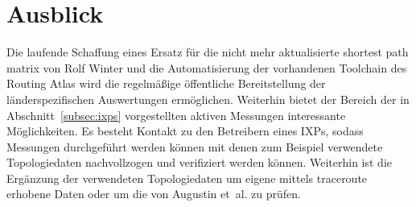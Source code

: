 \section{Ausblick}\label{sec:ausblick}
Die laufende Schaffung eines Ersatz für die nicht mehr aktualisierte shortest path matrix von Rolf Winter und die Automatisierung der vorhandenen Toolchain des Routing Atlas wird die regelmäßige öffentliche Bereitstellung der länderspezifischen Auswertungen ermöglichen.
Weiterhin bietet der Bereich der in Abschnitt~\ref{subsec:ixps} vorgestellten aktiven Messungen interessante Möglichkeiten.
Es besteht Kontakt zu den Betreibern eines IXPs, sodass Messungen durchgeführt werden können mit denen zum Beispiel verwendete Topologiedaten nachvollzogen und verifiziert werden können.
Weiterhin ist die Ergänzung der verwendeten Topologiedaten um eigene mittels traceroute erhobene Daten oder um die von Augustin et~al. zu prüfen.

